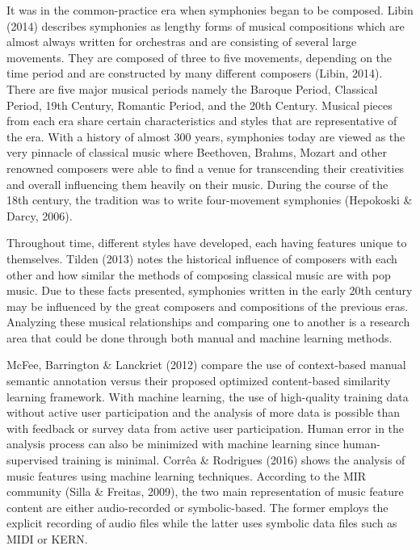 	It was in the common-practice era when symphonies began to be composed. Libin (2014) describes symphonies as lengthy forms of musical compositions which are almost always written for orchestras and are consisting of several large movements. They are composed of three to five movements, depending on the time period and are constructed by many different composers (Libin, 2014). There are five major musical periods namely the Baroque Period, Classical Period, 19th Century, Romantic Period, and the 20th Century. Musical pieces from each era share certain characteristics and styles that are representative of the era. With a history of almost 300 years, symphonies today are viewed as the very pinnacle of classical music where Beethoven, Brahms, Mozart and other renowned composers were able to find a venue for transcending their creativities and overall influencing them heavily on their music. During the course of the 18th century, the tradition was  to write four-movement symphonies (Hepokoski \& Darcy, 2006). 

	Throughout time, different styles have developed, each having features unique to themselves. Tilden (2013) notes the historical influence of composers with each other and how similar the methods of composing classical music are with pop music.  Due to these facts presented, symphonies written in the early 20th century may be influenced by the great composers and compositions of the previous eras. Analyzing these musical relationships and comparing one to another is a research area that could be done through both manual and machine learning methods.

	McFee, Barrington \& Lanckriet (2012) compare the use of context-based manual semantic annotation versus their proposed optimized content-based similarity learning framework. With machine learning, the use of high-quality training data without active user participation and the analysis of more data is possible than with feedback or survey data from active user participation. Human error in the analysis process can also be minimized with machine learning since human-supervised training is minimal. Corrêa \& Rodrigues (2016) shows the analysis of music features using machine learning techniques. According to the MIR community (Silla \& Freitas, 2009), the two main representation of music feature content are either audio-recorded or symbolic-based. The former employs the explicit recording of audio files while the latter uses symbolic data files such as MIDI or KERN.

